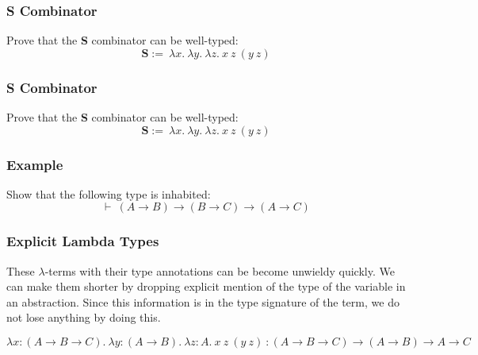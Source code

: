 \documentclass{beamer}
\theoremstyle{indentDefn} \newtheorem{defn}[]{Definition}
\begin{document}
\begin{frame}
	\frametitle{S Combinator}
	
	Prove that the \textbf{S} combinator can be well-typed: 	
	$$\textbf{S}:= \ \lambda x. \ \lambda y. \ \lambda z. \ x \ z \ (y \ z)$$
	
	
	\vspace{60mm}

\end{frame}

\begin{frame}
	\frametitle{S Combinator}
	
	Prove that the \textbf{S} combinator can be well-typed: 	
	$$\textbf{S}:= \ \lambda x. \ \lambda y. \ \lambda z. \ x \ z \ (y \ z)$$
	
	
	\vspace{60mm}
	
	
\end{frame}

\begin{frame}
  \frametitle{Example}

  Show that the following type is inhabited:
  $$ \vdash \ (A \to B) \to (B \to C) \to (A \to C)$$

  \vspace{70mm}
\end{frame}

\begin{frame}
  \frametitle{Explicit Lambda Types}

  These $\lambda$-terms with their type annotations can be become unwieldy quickly. We can make them shorter by dropping explicit mention of the type of the variable in an abstraction. Since this information is in the type signature of the term, we do not lose anything by doing this. 
  
  \tiny{$$\lambda x : (A \to B \to C). \ \lambda y : (A \to B). \ \lambda z : A. \ x \ z \ (y \ z) \ : (A \to B \to C) \to (A \to B) \to A \to C$$}

  \vspace{50mm}

\end{frame}
\end{document}
